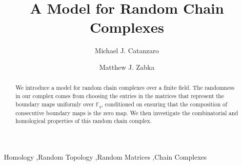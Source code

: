 \documentclass[3p,times]{elsarticle}
\theoremstyle{remark}
\begin{document}
\begin{frontmatter}




\title{A Model for Random Chain Complexes}


\author[mike]{Michael J. Catanzaro}
\author[matt]{Matthew J. Zabka}
\address[mike]{Iowa State University}
\address[matt]{Southwest Minnesota State University}

\begin{abstract}
We introduce a model for random chain complexes over a finite
field. The randomness in our complex comes from choosing the entries in the
matrices that represent the boundary maps uniformly over $\mathbb{F}_q$,
conditioned on ensuring that the composition of consecutive boundary maps is
the zero map.  We then investigate the combinatorial and homological 
properties of this random chain complex.
\end{abstract}

\begin{keyword}
Homology \sep Random Topology \sep Random Matrices \sep Chain Complexes


\end{keyword}

\end{frontmatter}
\end{document}

